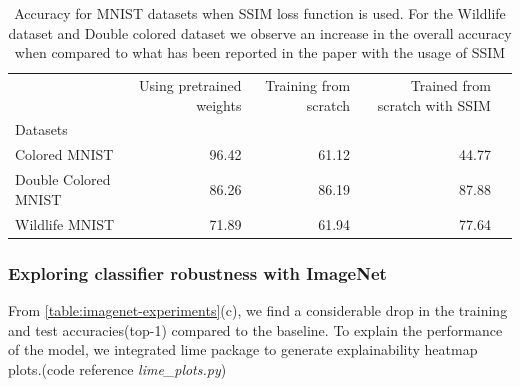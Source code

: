 \begin{table}[h]
\centering
\tiny
\begin{tabular}{lrrrr}
\toprule
{} & Using pretrained weights &  Training from scratch & Trained from scratch with SSIM \cite{wang2004image}\\
Datasets  &              &              &                            \\
\midrule
Colored MNIST              &        96.42 &        61.12 &         44.77  \\
Double Colored MNIST              &        86.26  &        86.19 &         87.88  \\
Wildlife MNIST              &        71.89 &        61.94 &         77.64  \\
\bottomrule
\end{tabular}
\caption{Accuracy for MNIST datasets when SSIM  \cite{wang2004image} loss function is used. For the Wildlife dataset  and Double colored dataset we observe an increase in the overall accuracy when compared to what has been reported in the paper with the usage of SSIM \cite{wang2004image} }
\label{table:ssim-table}

\end{table}


\subsubsection{Exploring classifier robustness with ImageNet}

From \ref{table:imagenet-experiments}(c), we find a considerable drop in the training and test accuracies(top-1) compared to the baseline. To explain the performance of the model, we integrated lime\cite{lime} package to generate explainability heatmap plots.(code reference \textit{lime\_plots.py})


